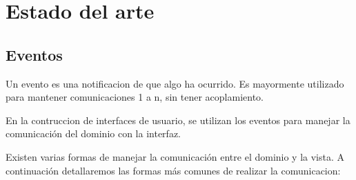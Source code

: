 \section{Estado del arte}
\label{sec:StateOfTheArt}


\subsection{Eventos}
Un evento es una notificacion de que algo ha ocurrido. Es mayormente utilizado
para mantener comunicaciones 1 a n, sin tener acoplamiento.

En la contruccion de interfaces de usuario, se utilizan los eventos para 
manejar la comunicación del dominio con la interfaz.

\bigskip

Existen varias formas de manejar la comunicación entre el dominio y la vista. 
A continuación detallaremos las formas más comunes de realizar la comunicacion:

